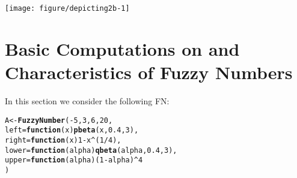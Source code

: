 \documentclass[11pt]{article}\usepackage[]{graphicx}\usepackage[]{color}
\makeatletter
\newcommand{\hlnum}[1]{\textcolor[rgb]{0.686,0.059,0.569}{#1}}%
\newcommand{\hlopt}[1]{\textcolor[rgb]{0,0,0}{#1}}%
\newcommand{\hlstd}[1]{\textcolor[rgb]{0.345,0.345,0.345}{#1}}%
\newcommand{\hlkwa}[1]{\textcolor[rgb]{0.161,0.373,0.58}{\textbf{#1}}}%
\newcommand{\hlkwb}[1]{\textcolor[rgb]{0.69,0.353,0.396}{#1}}%
\newcommand{\hlkwc}[1]{\textcolor[rgb]{0.333,0.667,0.333}{#1}}%
\newcommand{\hlkwd}[1]{\textcolor[rgb]{0.737,0.353,0.396}{\textbf{#1}}}%
\newenvironment{kframe}{%
 \def\at@end@of@kframe{}%
 \ifinner\ifhmode%
  \def\at@end@of@kframe{\end{minipage}}%
  \begin{minipage}{\columnwidth}%
 \fi\fi%
 \def\FrameCommand##1{\hskip\@totalleftmargin \hskip-\fboxsep
 \colorbox{shadecolor}{##1}\hskip-\fboxsep
     \hskip-\linewidth \hskip-\@totalleftmargin \hskip\columnwidth}%
 \MakeFramed {\advance\hsize-\width
   \@totalleftmargin\z@ \linewidth\hsize
   \@setminipage}}%
 {\par\unskip\endMakeFramed%
 \at@end@of@kframe}
\newenvironment{knitrout}{}{} %
\newcommand{\package}[1]{\textsf{#1}\xspace}
\newcommand{\lang}[1]{\textsf{#1}\xspace}
\newcommand{\R}{\lang{R}}
\makeatother
\begin{document}
\begin{center}
\begin{knitrout}\small
{}\color{fgcolor}

{\centering \texttt{[image: figure/depicting2b-1]} 

}



\end{knitrout}
\end{center}








\section{Basic Computations on and Characteristics of Fuzzy Numbers}


In this section we consider the following FN:

\begin{knitrout}\small
{}\color{fgcolor}\begin{kframe}
\begin{alltt}
\hlstd{A} \hlkwb{<-} \hlkwd{FuzzyNumber}\hlstd{(}\hlopt{-}\hlnum{5}\hlstd{,} \hlnum{3}\hlstd{,} \hlnum{6}\hlstd{,} \hlnum{20}\hlstd{,}
    \hlkwc{left}\hlstd{=}\hlkwa{function}\hlstd{(}\hlkwc{x}\hlstd{)} \hlkwd{pbeta}\hlstd{(x,}\hlnum{0.4}\hlstd{,}\hlnum{3}\hlstd{),}
   \hlkwc{right}\hlstd{=}\hlkwa{function}\hlstd{(}\hlkwc{x}\hlstd{)} \hlnum{1}\hlopt{-}\hlstd{x}\hlopt{^}\hlstd{(}\hlnum{1}\hlopt{/}\hlnum{4}\hlstd{),}
   \hlkwc{lower}\hlstd{=}\hlkwa{function}\hlstd{(}\hlkwc{alpha}\hlstd{)} \hlkwd{qbeta}\hlstd{(alpha,}\hlnum{0.4}\hlstd{,}\hlnum{3}\hlstd{),}
   \hlkwc{upper}\hlstd{=}\hlkwa{function}\hlstd{(}\hlkwc{alpha}\hlstd{) (}\hlnum{1}\hlopt{-}\hlstd{alpha)}\hlopt{^}\hlnum{4}
\hlstd{)}
\end{alltt}
\end{kframe}
\end{knitrout}
\end{document}
